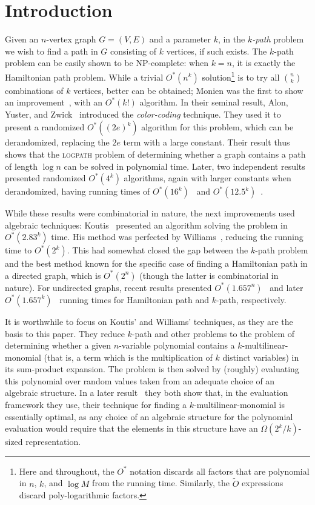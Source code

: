 \documentclass{llncs}
\begin{document}
\section{Introduction}
Given an $n$-vertex graph $G=(V,E)$ and a parameter $k$, in the \emph{$k$-path} problem we wish to find a path in $G$ consisting of $k$ vertices, if such exists. 
The $k$-path problem can be easily shown to be NP-complete: when $k=n$, it is exactly the Hamiltonian path problem. While a trivial $O^*(n^k)$ solution\footnote{Here and throughout, the $O^*$ notation discards all factors that are polynomial in $n$, $k$, and $\log M$ from the running time. Similarly, the $\tilde{O}$ expressions discard poly-logarithmic factors. 
} is to try all $\binom{n}{k}$ combinations of $k$ vertices, better can be obtained; Monien was the first to show an improvement~\cite{Monien85}, with an $O^*(k!)$ algorithm. In their seminal result, Alon, Yuster, and Zwick~\cite{AYZ95}  introduced the \emph{color-coding} technique. They used it to present a randomized $O^*((2e)^k)$ algorithm for this problem, which can be derandomized, replacing the $2e$ term with a large constant. Their result thus shows that the \textsc{logpath} problem of determining whether a graph contains a path of length $\log n$ can be solved in polynomial time.
Later, two independent results~\cite{KMRR06,CLSZ07} presented randomized $O^*(4^k)$ algorithms, again with larger constants when derandomized, having running times of $O^*(16^k)$~\cite{KMRR06} and $O^*(12.5^k)$~\cite{CLSZ07}.

While these results were combinatorial in nature, the next improvements used algebraic techniques: Koutis~\cite{Koutis08} presented an algorithm solving the problem in $O^*(2.83^k)$ time. His method was perfected by Williams~\cite{Williams09}, reducing the running time to $O^*(2^k)$. This had somewhat closed the gap between the $k$-path problem and the best method known for the specific case of finding a Hamiltonian path in a directed graph, which is $O^*(2^n)$ (though the latter is combinatorial in nature). For undirected graphs, recent results presented $O^*(1.657^n)$~\cite{Bjorklund10} and later $O^*(1.657^k)$~\cite{BHKK10,AB13}
running times for Hamiltonian path and $k$-path, respectively.

It is worthwhile to focus on Koutis' and Williams' techniques, as they are the basis to this paper. They reduce $k$-path and other problems to the problem of determining whether a given $n$-variable polynomial contains a $k$-multilinear-monomial (that is, a term which is the multiplication of $k$ distinct variables) in its sum-product expansion. The problem is then solved by (roughly) evaluating this polynomial over random values taken from an adequate choice of an algebraic structure. 
In a later result~\cite{KW09} they both show that, in the evaluation framework they use, their technique for finding a $k$-multilinear-monomial is essentially optimal, as any choice of an algebraic structure for the polynomial evaluation would require that the elements in this structure have an $\Omega(2^k/k)$-sized representation. 
\end{document}
